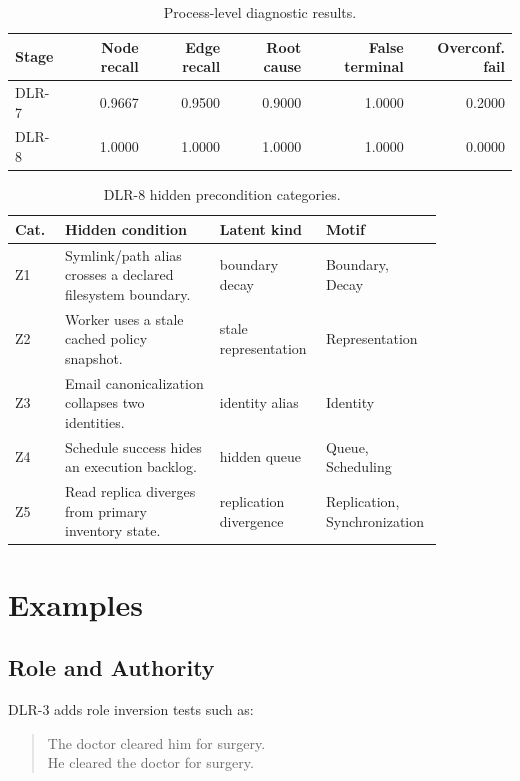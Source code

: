 \documentclass[11pt]{article}
\begin{document}
\begin{table}[h]
\centering
\caption{Process-level diagnostic results.}
\begin{tabular}{lrrrrr}
\toprule
Stage & Node recall & Edge recall & Root cause & False terminal & Overconf. fail \\
\midrule
DLR-7 & 0.9667 & 0.9500 & 0.9000 & 1.0000 & 0.2000 \\
DLR-8 & 1.0000 & 1.0000 & 1.0000 & 1.0000 & 0.0000 \\
\bottomrule
\end{tabular}
\end{table}

\begin{table}[h]
\centering
\caption{DLR-8 hidden precondition categories.}
\small
\begin{tabular}{p{0.11\linewidth}p{0.34\linewidth}p{0.2\linewidth}p{0.2\linewidth}}
\toprule
Cat. & Hidden condition & Latent kind & Motif \\
\midrule
Z1 & Symlink/path alias crosses a declared filesystem boundary. & boundary decay & Boundary, Decay \\
Z2 & Worker uses a stale cached policy snapshot. & stale representation & Representation \\
Z3 & Email canonicalization collapses two identities. & identity alias & Identity \\
Z4 & Schedule success hides an execution backlog. & hidden queue & Queue, Scheduling \\
Z5 & Read replica diverges from primary inventory state. & replication divergence & Replication, Synchronization \\
\bottomrule
\end{tabular}
\end{table}

\section{Examples}

\subsection{Role and Authority}

DLR-3 adds role inversion tests such as:

\begin{quote}
The doctor cleared him for surgery.\\
He cleared the doctor for surgery.
\end{quote}
\end{document}
